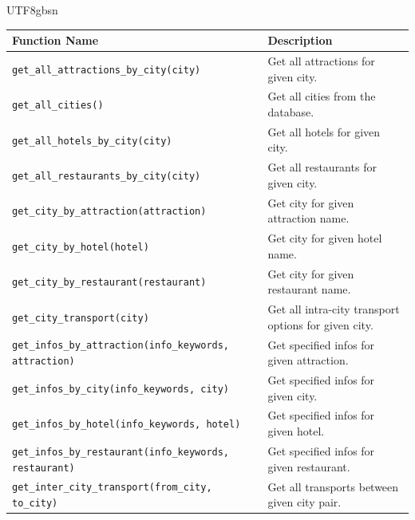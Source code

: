\documentclass[11pt, a4paper, logo, copyright, nonumbering]{deepseek}
\begin{document}
\begin{CJK*}{UTF8}{gbsn}
\begin{tcolorbox}[
  floatplacement=ht,
  title={Tool Set for Trip Planning},
  label={case:tools}
]
\scriptsize
\begin{tabularx}{\textwidth}{l X}
\toprule
\textbf{Function Name} & \textbf{Description} \\
\midrule
\texttt{get\_all\_attractions\_by\_city(city)} &
Get all attractions for given city. \\[0.3em]

\texttt{get\_all\_cities()} &
Get all cities from the database. \\[0.3em]

\texttt{get\_all\_hotels\_by\_city(city)} &
Get all hotels for given city. \\[0.3em]

\texttt{get\_all\_restaurants\_by\_city(city)} &
Get all restaurants for given city. \\[0.3em]

\texttt{get\_city\_by\_attraction(attraction)} &
Get city for given attraction name. \\[0.3em]

\texttt{get\_city\_by\_hotel(hotel)} &
Get city for given hotel name. \\[0.3em]

\texttt{get\_city\_by\_restaurant(restaurant)} &
Get city for given restaurant name. \\[0.3em]

\texttt{get\_city\_transport(city)} &
Get all intra-city transport options for given city. \\[0.3em]

\texttt{get\_infos\_by\_attraction(info\_keywords, attraction)} &
Get specified infos for given attraction. \\[0.3em]

\texttt{get\_infos\_by\_city(info\_keywords, city)} &
Get specified infos for given city. \\[0.3em]

\texttt{get\_infos\_by\_hotel(info\_keywords, hotel)} &
Get specified infos for given hotel. \\[0.3em]

\texttt{get\_infos\_by\_restaurant(info\_keywords, restaurant)} &
Get specified infos for given restaurant. \\[0.3em]

\texttt{get\_inter\_city\_transport(from\_city, to\_city)} &
Get all transports between given city pair. \\[0.3em]


\end{tabularx}
\end{tcolorbox}
\end{CJK*}
\end{document}
